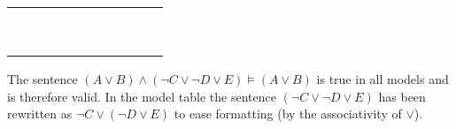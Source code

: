 \begin{enumerate}
\begin{enumerate}
\begin{tabular}{ccccccccc|c|c}
\T & \T & \F & \T & \F & \T & \F & \T & \T & \T & \T \\
\T & \T & \T & \T & \T & \T & \T & \T & \F & \T & \T \\
\T & \T & \T & \T & \T & \T & \T & \T & \T & \T & \T \\
\T & \T & \T & \T & \T & \T & \F & \F & \F & \T & \T \\
\T & \T & \T & \T & \T & \T & \F & \T & \T & \T & \T \\
\T & \T & \T & \T & \F & \T & \T & \T & \F & \T & \T \\
\T & \T & \T & \T & \F & \T & \T & \T & \T & \T & \T \\
\T & \T & \T & \F & \F & \F & \F & \F & \F & \T & \T \\
\T & \T & \T & \T & \F & \T & \F & \T & \T & \T & \T \\
\end{tabular}

The sentence $(A \lor B) \land (\neg C \lor \neg D \lor E) \vDash (A \lor B)$ is true in all models and is therefore valid. In the model table the sentence $(\neg C \lor \neg D \lor E)$ has been rewritten as $\neg C \lor (\neg D \lor E)$ to ease formatting (by the associativity of $\lor$).


\end{enumerate}
\end{enumerate}
